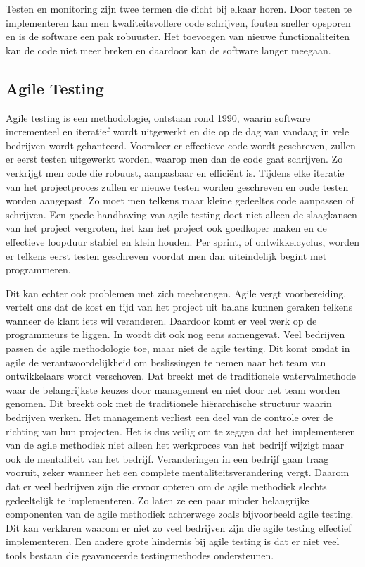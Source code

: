 Testen en monitoring zijn twee termen die dicht bij elkaar horen. Door testen te implementeren kan men kwaliteitsvollere code schrijven, fouten sneller opsporen en is de software een pak robuuster. Het toevoegen van nieuwe functionaliteiten kan de code niet meer breken en daardoor kan de software langer meegaan. 

\subsection{Agile Testing}
\label{sec:agile}

Agile testing is een methodologie, ontstaan rond 1990, waarin software incrementeel en iteratief wordt uitgewerkt en die op de dag van vandaag in vele bedrijven wordt gehanteerd. Vooraleer er effectieve code wordt geschreven, zullen er eerst testen uitgewerkt worden, waarop men dan de code gaat schrijven. Zo verkrijgt men code die robuust, aanpasbaar en efficiënt is. Tijdens elke iteratie van het projectproces zullen er nieuwe testen worden geschreven en oude testen worden aangepast. Zo moet men telkens maar kleine gedeeltes code aanpassen of schrijven. Een goede handhaving van agile testing doet niet alleen de slaagkansen van het project vergroten, het kan het project ook goedkoper maken en de effectieve loopduur stabiel en klein houden.
Per sprint, of ontwikkelcyclus, worden er telkens eerst testen geschreven voordat men dan uiteindelijk begint met programmeren. \autocite{CHAKRAVORTY2014536}

Dit kan echter ook problemen met zich meebrengen. Agile vergt voorbereiding. \textcite{CHAKRAVORTY2014536} vertelt ons dat de kost en tijd van het project uit balans kunnen geraken telkens wanneer de klant iets wil veranderen. Daardoor komt er veel werk op de programmeurs te liggen. In \autocite{Borland2012} wordt dit ook nog eens samengevat. Veel bedrijven passen de agile methodologie toe, maar niet de agile testing. Dit komt omdat in agile de verantwoordelijkheid om beslissingen te nemen naar het team van ontwikkelaars wordt verschoven. Dat breekt met de traditionele watervalmethode waar de belangrijkste keuzes door management en niet door het team worden genomen. Dit breekt ook met de traditionele hiërarchische structuur waarin bedrijven werken. Het management verliest een deel van de controle over de richting van hun projecten. Het is dus veilig om te zeggen dat het implementeren van de agile methodiek niet alleen het werkproces van het bedrijf wijzigt maar ook de mentaliteit van het bedrijf. Veranderingen in een bedrijf gaan traag vooruit, zeker wanneer het een complete mentaliteitsverandering vergt. Daarom dat er veel bedrijven zijn die ervoor opteren om de agile methodiek slechts gedeeltelijk te implementeren. Zo laten ze een paar minder belangrijke componenten van de agile methodiek achterwege zoals bijvoorbeeld agile testing. Dit kan verklaren waarom er niet zo veel bedrijven zijn die agile testing effectief implementeren. Een andere grote hindernis bij agile testing is dat er niet veel tools bestaan die geavanceerde testingmethodes ondersteunen.

